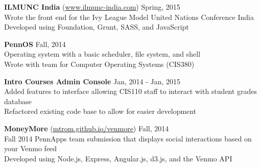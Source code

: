 \documentclass{resume} %
\begin{document}

\hspace*{1mm} {\bf ILMUNC India } (\href{http://www.ilmunc-india.com/}{www.ilmunc-india.com}) \hfill Spring, 2015 \\
\hspace*{3mm} Wrote the front end for the Ivy League Model United Nations Conference India \\
\hspace*{3mm} Developed using Foundation, Grunt, SASS, and JavaScript


\hspace*{1mm} {\bf PennOS } \hfill Fall, 2014 \\
\hspace*{3mm} Operating system with a basic scheduler, file system, and shell \\
\hspace*{3mm} Wrote with team for Computer Operating Systems (CIS380)


\hspace*{1mm} {\bf Intro Courses Admin Console } \hfill Jan, 2014 - Jan, 2015 \\
\hspace*{3mm} Added features to interface allowing CIS110 staff to interact with student grades database \\
\hspace*{3mm} Refactored existing code base to allow for easier development


\hspace*{1mm} {\bf MoneyMore } (\href{http://boiling-falls-3529.herokuapp.com/}{mtrom.github.io/venmore}) \hfill Fall, 2014 \\
\hspace*{3mm} Fall 2014 PennApps team submission that displays social interactions based on your Venmo feed \\
\hspace*{3mm} Developed using Node.js, Express, Angular.js, d3.js, and the Venmo API
\fi

\end{document}
